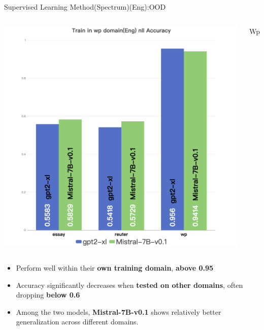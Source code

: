 \documentclass[serif]{beamer}
\begin{document}
\begin{frame}{Supervised Learning Method(Spectrum)(Eng):OOD}
\begin{columns}[t]
    \centering
    \includegraphics[width=\linewidth]{images/Train in wp domain(Eng) nll Accuracy.png}
    \caption*{Wp}
\end{columns}
\begin{itemize}
    \item Perform well within their \textbf{own training domain}, \textbf{above 0.95}
    \item Accuracy significantly decreases when \textbf{tested on other domains}, often dropping \textbf{below 0.6}
    \item Among the two models, \textbf{Mistral-7B-v0.1} shows relatively better generalization across different domains.
    
\end{itemize}
\end{frame}
\end{document}
